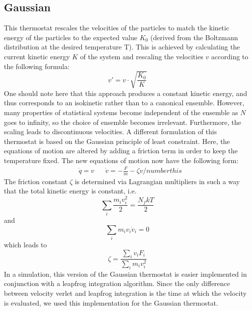 \subsection{Gaussian}\label{th:gaussian}
This thermostat rescales the velocities of the particles to match the kinetic energy of the particles to the expected value $K_0$ (derived from the Boltzmann distribution at the desired temperature T). This is achieved by calculating the current kinetic energy $K$ of the system and rescaling the velocities $v$ according to the following formula:
\begin{equation}
v'  = v\cdot \sqrt{\frac{K_0}{K}}\label{eq:gauss}
\end{equation}
One should note here that this approach produces a constant kinetic energy, and thus corresponds to an isokinetic rather than to a canonical ensemble. However, many properties of statistical systems become independent of the ensemble as $N$ goes to infinity, so the choice of ensemble becomes irrelevant.  
Furthermore, the scaling leads to discontinuous velocities. A different formulation of this thermostat is based on the Gaussian principle of least constraint. Here, the equations of motion are altered by adding a friction term in order to keep the temperature fixed. The new equations of motion now have the following form:
\begin{align*}
&  \dot{q} = v && \dot{v} = - \frac{F}{m} - \zeta v /numberthis 
\end{align*}
The friction constant $\zeta$ is determined via Lagrangian multipliers in such a way that the total kinetic energy is constant, i.e. 
\begin{equation}
\sum_i \frac{m_i v_i^2}{2} = \frac{N_f k T}{2} 
\end{equation}
and 
\begin{equation}
\sum_i m_i v_i \dot{v}_i = 0 
\end{equation}
which leads to 
\begin{equation}
\zeta = \frac{\sum_i v_i F_i}{\sum_i m_i v_i^2}
\end{equation}
In a simulation, this version of the Gaussian thermostat is easier implemented in conjunction with a leapfrog integration algorithm. Since the only difference between velocity verlet and leapfrog integration is the time at which the velocity is evaluated, we used this implementation for the Gaussian thermostat.    

